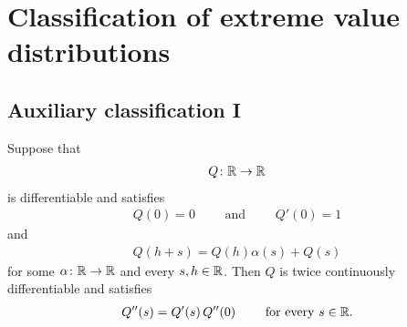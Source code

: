 \chapter{Classification of extreme value distributions}

\section{Auxiliary classification I}

\begin{lemma}
  \label{lem:ode-of-order-two-for-Q}
  Suppose that
  \begin{align*}
  Q \colon \mathbb{R} \to \mathbb{R}
  \end{align*}
  is differentiable and satisfies
  \begin{align*}
  Q(0) = 0 \qquad \text{ and } \qquad Q'(0) = 1
  \end{align*}
  and
  \begin{align*}
  Q(h+s) = Q(h) \alpha(s) + Q(s)
  \end{align*}
  for some $\alpha \colon \mathbb{R} \to \mathbb{R}$ and every $s,h \in \mathbb{R}$.
  Then $Q$ is twice continuously differentiable and satisfies
  \begin{align}
    Q'' (s) = Q'(s) \, Q'' (0) \qquad \text{ for every } s \in \mathbb{R} .
  \end{align}
\end{lemma}
